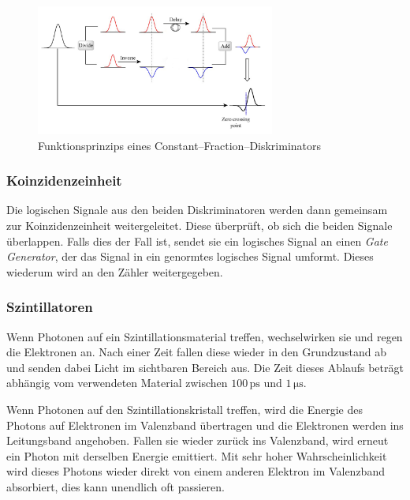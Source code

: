 \documentclass[12pt,a4paper]{scrartcl}
\numberwithin{equation}{section} %
\newcommand{\pu}[1]{\ensuremath{\mathrm{#1}}}
\begin{document}
\begin{figure}[h]
	\centering
	\includegraphics[width=0.7\textwidth]{../media/B3.4/CFD.jpg}
	\caption{Funktionsprinzips eines Constant--Fraction--Diskriminators \cite{abb:CDF}}
	\label{abb:CFD}
\end{figure}

\hypertarget{koinzidenzeinheit}{%
\subsubsection{Koinzidenzeinheit}\label{koinzidenzeinheit}}

Die logischen Signale aus den beiden Diskriminatoren werden dann gemeinsam zur Koinzidenzeinheit weitergeleitet. Diese überprüft, ob sich die beiden Signale überlappen. Falls dies der Fall ist, sendet sie ein logisches Signal an einen \emph{Gate Generator}, der das Signal in ein genormtes logisches Signal umformt. Dieses wiederum wird an den Zähler weitergegeben.

\hypertarget{szintillatoren}{%
\subsubsection{Szintillatoren}\label{szintillatoren}}
Wenn Photonen auf ein Szintillationsmaterial treffen, wechselwirken sie und regen die Elektronen an. Nach einer Zeit fallen diese wieder in den Grundzustand ab und senden dabei Licht im sichtbaren Bereich aus. Die Zeit dieses Ablaufs beträgt abhängig vom verwendeten Material zwischen $\pu{100\, ps}$ und $\pu{1\,\mu s}$.

Wenn Photonen auf den Szintillationskristall treffen, wird die Energie des Photons auf Elektronen im Valenzband übertragen und die Elektronen werden ins Leitungsband angehoben. Fallen sie wieder zurück ins Valenzband, wird erneut ein Photon mit derselben Energie emittiert. Mit sehr hoher Wahrscheinlichkeit wird dieses Photons wieder direkt von einem anderen Elektron im Valenzband absorbiert, dies kann unendlich oft passieren.
\end{document}
